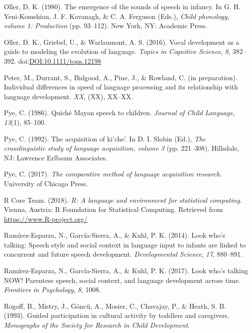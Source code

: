 \documentclass[floatsintext,man]{apa6}
\theoremstyle{definition}
\theoremstyle{definition}
\theoremstyle{definition}
\theoremstyle{remark}
\begin{document}
\hypertarget{ref-oller1980emergence}{}
Oller, D. K. (1980). The emergence of the sounds of speech in infancy.
In G. H. Yeni-Komshian, J. F. Kavanagh, \& C. A. Ferguson (Eds.),
\emph{Child phonology, volume 1: Production} (pp. 93--112). New York,
NY: Academic Press.

\hypertarget{ref-oller2016vocal}{}
Oller, D. K., Griebel, U., \& Warlaumont, A. S. (2016). Vocal
development as a guide to modeling the evolution of language.
\emph{Topics in Cognitive Science}, \emph{8}, 382--392.
doi:\href{https://doi.org/DOI:10.1111/tops.12198}{DOI:10.1111/tops.12198}

\hypertarget{ref-peterIPindividual}{}
Peter, M., Durrant, S., Bidgood, A., Pine, J., \& Rowland, C. (in
preparation). Individual differences in speed of language processing and
its relationship with language development. \emph{XX}, (XX), XX--XX.

\hypertarget{ref-pye1986quiche}{}
Pye, C. (1986). Quiché Mayan speech to children. \emph{Journal of Child
Language}, \emph{13}(1), 85--100.

\hypertarget{ref-pye1992acquisition}{}
Pye, C. (1992). The acquisition of ki'che'. In D. I. Slobin (Ed.),
\emph{The crosslinguistic study of language acquisition, volume 3} (pp.
221--308). Hillsdale, NJ: Lawrence Erlbaum Associates.

\hypertarget{ref-pye2017comparative}{}
Pye, C. (2017). \emph{The comparative method of language acquisition
research}. University of Chicago Press.

\hypertarget{ref-R-base}{}
R Core Team. (2018). \emph{R: A language and environment for statistical
computing}. Vienna, Austria: R Foundation for Statistical Computing.
Retrieved from \url{https://www.R-project.org/}

\hypertarget{ref-ramirezesparza2014look}{}
Ramírez-Esparza, N., García-Sierra, A., \& Kuhl, P. K. (2014). Look
who's talking: Speech style and social context in language input to
infants are linked to concurrent and future speech development.
\emph{Developmental Science}, \emph{17}, 880--891.

\hypertarget{ref-ramirezesparza2017look}{}
Ramírez-Esparza, N., García-Sierra, A., \& Kuhl, P. K. (2017). Look
who's talking NOW! Parentese speech, social context, and language
development across time. \emph{Frontiers in Psychology}, \emph{8}, 1008.

\hypertarget{ref-rogoff1993guided}{}
Rogoff, B., Mistry, J., Göncü, A., Mosier, C., Chavajay, P., \& Heath,
S. B. (1993). Guided participation in cultural activity by toddlers and
caregivers. \emph{Monographs of the Society for Research in Child
Development}.
\end{document}
